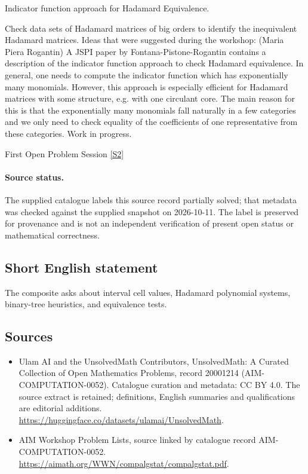\documentclass[11pt]{article}
\begin{document}
Indicator function approach for Hadamard Equivalence.

Check data sets of Hadamard matrices of big orders to identify the inequivalent Hadamard matrices. Ideas that were suggested during the workshop: (Maria Piera Rogantin) A JSPI paper by Fontana-Pistone-Rogantin contains a description of the indicator function approach to check Hadamard equivalence. In general, one needs to compute the indicator function which has exponentially many monomials. However, this approach is especially efficient for Hadamard matrices with some structure, e.g. with one circulant core. The main reason for this is that the exponentially many monomials fall naturally in a few categories and we only need to check equality of the coefficients of one representative from these categories. Work in progress.

First Open Problem Session \href{https://aimath.org/WWN/compalgstat/compalgstat.pdf}{[S2]}
\paragraph{Source status.}
The supplied catalogue labels this source record partially solved; that metadata was checked against the supplied snapshot on 2026-10-11. The label is preserved for provenance and is not an independent verification of present open status or mathematical correctness.
\subsection{Short English statement}
The composite asks about interval cell values, Hadamard polynomial systems, binary-tree heuristics, and equivalence tests.
\subsection{Sources}
\begin{itemize}
\item[S1] Ulam AI and the UnsolvedMath Contributors, UnsolvedMath: A Curated Collection of Open Mathematics Problems, record 20001214 (AIM-COMPUTATION-0052). Catalogue curation and metadata: CC BY 4.0. The source extract is retained; definitions, English summaries and qualifications are editorial additions.
\url{https://huggingface.co/datasets/ulamai/UnsolvedMath}.
\item[S2] AIM Workshop Problem Lists, source linked by catalogue record AIM-COMPUTATION-0052.
\url{https://aimath.org/WWN/compalgstat/compalgstat.pdf}.
\end{itemize}
\end{document}
